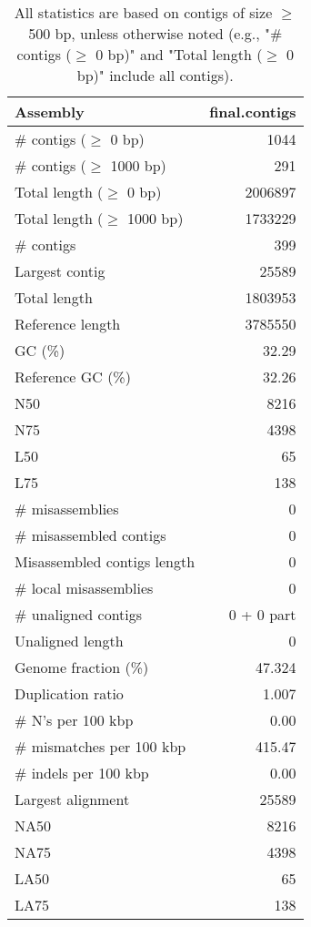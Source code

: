 \documentclass[12pt,a4paper]{article}
\begin{document}
\begin{table}[ht]
\begin{center}
\caption{All statistics are based on contigs of size $\geq$ 500 bp, unless otherwise noted (e.g., "\# contigs ($\geq$ 0 bp)" and "Total length ($\geq$ 0 bp)" include all contigs).}
\begin{tabular}{|l*{1}{|r}|}
\hline
Assembly & final.contigs \\ \hline
\# contigs ($\geq$ 0 bp) & 1044 \\ \hline
\# contigs ($\geq$ 1000 bp) & 291 \\ \hline
Total length ($\geq$ 0 bp) & 2006897 \\ \hline
Total length ($\geq$ 1000 bp) & 1733229 \\ \hline
\# contigs & 399 \\ \hline
Largest contig & 25589 \\ \hline
Total length & 1803953 \\ \hline
Reference length & 3785550 \\ \hline
GC (\%) & 32.29 \\ \hline
Reference GC (\%) & 32.26 \\ \hline
N50 & 8216 \\ \hline
N75 & 4398 \\ \hline
L50 & 65 \\ \hline
L75 & 138 \\ \hline
\# misassemblies & 0 \\ \hline
\# misassembled contigs & 0 \\ \hline
Misassembled contigs length & 0 \\ \hline
\# local misassemblies & 0 \\ \hline
\# unaligned contigs & 0 + 0 part \\ \hline
Unaligned length & 0 \\ \hline
Genome fraction (\%) & 47.324 \\ \hline
Duplication ratio & 1.007 \\ \hline
\# N's per 100 kbp & 0.00 \\ \hline
\# mismatches per 100 kbp & 415.47 \\ \hline
\# indels per 100 kbp & 0.00 \\ \hline
Largest alignment & 25589 \\ \hline
NA50 & 8216 \\ \hline
NA75 & 4398 \\ \hline
LA50 & 65 \\ \hline
LA75 & 138 \\ \hline
\end{tabular}
\end{center}
\end{table}
\end{document}
